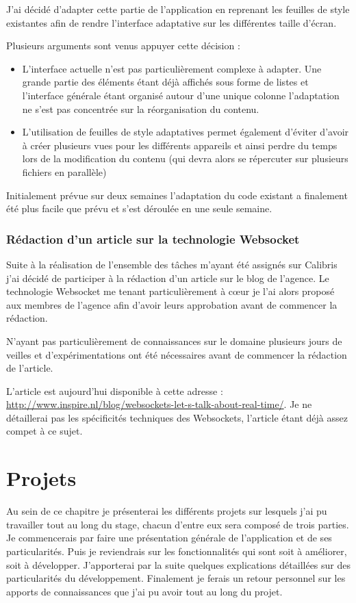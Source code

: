 \documentclass[12pt,a4paper]{book}
\begin{document}
J'ai décidé d'adapter cette partie de l'application en reprenant les feuilles de style existantes afin de rendre l'interface adaptative sur les différentes taille d'écran.

Plusieurs arguments sont venus appuyer cette décision :
\begin{itemize}
  \item L'interface actuelle n'est pas particulièrement complexe à adapter. Une grande partie des éléments étant déjà affichés sous forme de listes et l'interface générale étant organisé autour d'une unique colonne l'adaptation ne s'est pas concentrée sur la réorganisation du contenu.
  \item L'utilisation de feuilles de style adaptatives permet également d'éviter d'avoir à créer plusieurs vues pour les différents appareils et ainsi perdre du temps lors de la modification du contenu (qui devra alors se répercuter sur plusieurs fichiers en parallèle)
\end{itemize}

Initialement prévue sur deux semaines l'adaptation du code existant a finalement été plus facile que prévu et s'est déroulée en une seule semaine.

\subsection{Rédaction d'un article sur la technologie Websocket}

Suite à la réalisation de l'ensemble des tâches m'ayant été assignés sur Calibris j'ai décidé de participer à la rédaction d'un article sur le blog de l'agence. Le technologie Websocket me tenant particulièrement à cœur je l'ai alors proposé aux membres de l'agence afin d'avoir leurs approbation avant de commencer la rédaction.

N'ayant pas particulièrement de connaissances sur le domaine plusieurs jours de veilles et d'expérimentations ont été nécessaires avant de commencer la rédaction de l'article.

L'article est aujourd'hui disponible à cette adresse : \url{http://www.inspire.nl/blog/websockets-let-s-talk-about-real-time/}. Je ne détaillerai pas les spécificités techniques des Websockets, l'article étant déjà assez compet à ce sujet.

\chapter{Projets}

Au sein de ce chapitre je présenterai les différents projets sur lesquels j'ai pu travailler tout au long du stage, chacun d'entre eux sera composé de trois parties. Je commencerais par faire une présentation générale de l'application et de ses particularités. Puis je reviendrais sur les fonctionnalités qui sont soit à améliorer, soit à développer. J'apporterai par la suite quelques explications détaillées sur des particularités du développement. Finalement je ferais un retour personnel sur les apports de connaissances que j'ai pu avoir tout au long du projet.
\end{document}
